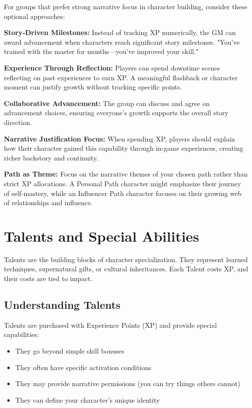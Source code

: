 \documentclass[11pt,twoside,openany]{book}
\begin{document}
For groups that prefer strong narrative focus in character building, consider these optional approaches:

\textbf{Story-Driven Milestones:} Instead of tracking XP numerically, the GM can award advancement when characters reach significant story milestones. "You've trained with the master for months—you've improved your skill."

\textbf{Experience Through Reflection:} Players can spend downtime scenes reflecting on past experiences to earn XP. A meaningful flashback or character moment can justify growth without tracking specific points.

\textbf{Collaborative Advancement:} The group can discuss and agree on advancement choices, ensuring everyone's growth supports the overall story direction.

\textbf{Narrative Justification Focus:} When spending XP, players should explain how their character gained this capability through in-game experiences, creating richer backstory and continuity.

\textbf{Path as Theme:} Focus on the narrative themes of your chosen path rather than strict XP allocations. A Personal Path character might emphasize their journey of self-mastery, while an Influencer Path character focuses on their growing web of relationships and influence.

\chapter{Talents and Special Abilities} \label{ch:talents}

Talents are the building blocks of character specialization. They represent learned techniques, supernatural gifts, or cultural inheritances. Each Talent costs XP, and their costs are tied to impact.

\section*{Understanding Talents} 

Talents are purchased with Experience Points (XP) and provide special capabilities:
\begin{itemize}
\item They go beyond simple skill bonuses
\item They often have specific activation conditions
\item They may provide narrative permissions (you can try things others cannot)
\item They can define your character's unique identity
\end{itemize}
\end{document}

